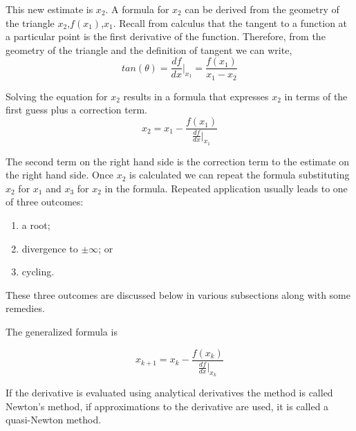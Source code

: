 This new estimate is $x_2$.  
A formula for $x_2$ can be derived from the geometry of the triangle $x_2$,$f(x_1)$,$x_1$.   
Recall from calculus that the tangent to a function at a particular point is the first derivative of the function.  
Therefore, from the geometry of the triangle and the definition of tangent we can write,
\begin{equation}
tan(\theta)=\frac{df}{dx}\Biggr\vert_{x_1} = \frac{f(x_1)}{x_1 - x_2}
\end{equation}

Solving the equation for $x_2$ results in a formula that expresses $x_2$ in terms of the first guess plus a correction term.
\begin{equation}
x_2=x_1 - \frac{f(x_1)}{\frac{df}{dx}\vert_{x_1}} 
\end{equation}

The second term on the right hand side is the correction term to the estimate on the right hand side.  
Once $x_2$ is calculated we can repeat the formula substituting $x_2$ for $x_1$ and $x_3$ for $x_2$ in the formula.  
Repeated application usually leads to one of three outcomes:
\begin{enumerate}
\item a root;
\item divergence to $\pm\infty$; or 
\item cycling.
\end{enumerate}

These three outcomes are discussed below in various subsections along with some remedies.


The generalized formula is 

\begin{equation}
x_{k+1}=x_{k} - \frac{  f(x_{k})  }{   \frac{df}{dx}\rvert_{x_k} } 
\label{eqn:NewtonFormula}
\end{equation}

If the derivative is evaluated using analytical derivatives the method is called Newton's method, if approximations to the derivative are used, it is called a quasi-Newton method.

